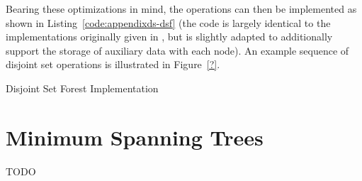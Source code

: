 \noindent Bearing these optimizations in mind, the operations can then be implemented as shown in Listing~\ref{code:appendixds-dsf} (the code is largely identical to the implementations originally given in \cite{worrell06}, but is slightly adapted to additionally support the storage of auxiliary data with each node). An example sequence of disjoint set operations is illustrated in Figure~\ref{?}.

\begin{stulisting}[p]
\caption{Disjoint Set Forest Implementation}
\label{code:appendixds-dsf}

\end{stulisting}

\section{Minimum Spanning Trees}

TODO
